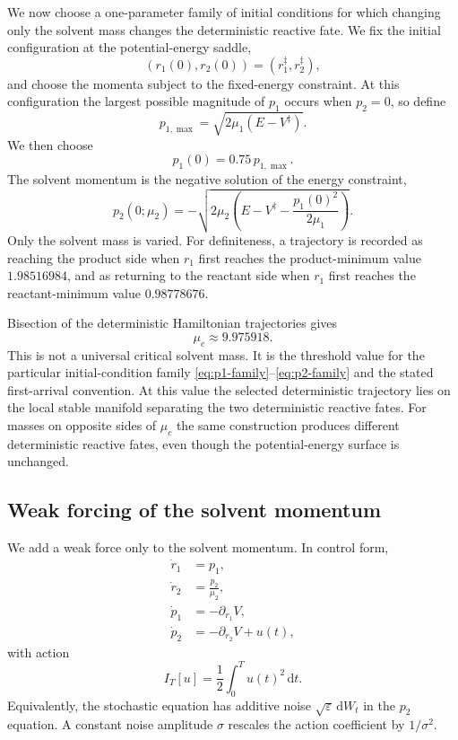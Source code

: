 \documentclass[11pt]{article}
\theoremstyle{definition}
\theoremstyle{remark}
\newcommand{\eps}{\varepsilon}
\newcommand{\dd}{\mathrm{d}}
\begin{document}
We now choose a one-parameter family of initial conditions for which changing only the solvent mass changes the deterministic reactive fate.  We fix the initial configuration at the potential-energy saddle,
\[
(r_1(0),r_2(0))=(r_1^\ddagger,r_2^\ddagger),
\]
and choose the momenta subject to the fixed-energy constraint.  At this configuration the largest possible magnitude of $p_1$ occurs when $p_2=0$, so define
\begin{equation}
p_{1,\max}=\sqrt{2\mu_1(E-V^\ddagger)}.
\end{equation}
We then choose
\begin{equation}
p_1(0)=0.75\,p_{1,\max}.
\label{eq:p1-family}
\end{equation}
The solvent momentum is the negative solution of the energy constraint,
\begin{equation}
p_2(0;\mu_2)
=-\sqrt{2\mu_2\left(E-V^\ddagger-\frac{p_1(0)^2}{2\mu_1}\right)}.
\label{eq:p2-family}
\end{equation}
Only the solvent mass is varied.  For definiteness, a trajectory is recorded as reaching the product side when $r_1$ first reaches the product-minimum value $1.98516984$, and as returning to the reactant side when $r_1$ first reaches the reactant-minimum value $0.98778676$.

Bisection of the deterministic Hamiltonian trajectories gives
\begin{equation}
\boxed{\mu_c\approx9.975918.}
\label{eq:mu-critical}
\end{equation}
This is not a universal critical solvent mass.  It is the threshold value for the particular initial-condition family \eqref{eq:p1-family}--\eqref{eq:p2-family} and the stated first-arrival convention.  At this value the selected deterministic trajectory lies on the local stable manifold separating the two deterministic reactive fates.  For masses on opposite sides of $\mu_c$ the same construction produces different deterministic reactive fates, even though the potential-energy surface is unchanged.

\subsection{Weak forcing of the solvent momentum}

We add a weak force only to the solvent momentum.  In control form,
\begin{align}
\dot r_1&=p_1,\\
\dot r_2&=\frac{p_2}{\mu_2},\\
\dot p_1&=-\partial_{r_1}V,\\
\dot p_2&=-\partial_{r_2}V+u(t),
\label{eq:solvent-control}
\end{align}
with action
\begin{equation}
I_T[u]=\frac12\int_0^T u(t)^2\,\dd t.
\label{eq:solvent-action}
\end{equation}
Equivalently, the stochastic equation has additive noise $\sqrt{\eps}\,\dd W_t$ in the $p_2$ equation.  A constant noise amplitude $\sigma$ rescales the action coefficient by $1/\sigma^2$.
\end{document}
